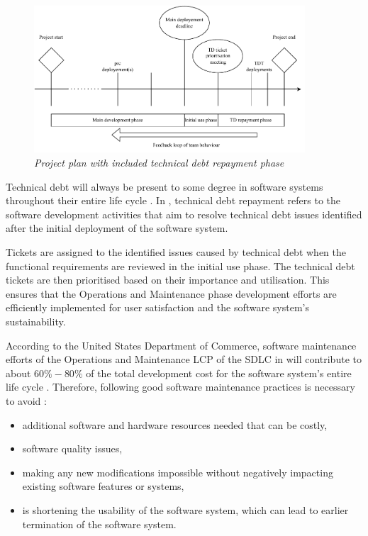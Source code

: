 \clearpage

\begin{figure}[!htb]
	\centering %
	\includegraphics[width=0.9\textwidth]{img/Chapter1/TD_repayment/TD_repayment.pdf}
	\caption[Project plan with included technical debt repayment phase]
	{\textit{Project plan with included technical debt repayment phase \cite{Wiese2021}}}\label{fig:ch1_tdRepayment}
\end{figure} 

Technical debt will always be present to some degree in software systems throughout their entire life cycle \cite{Wiese2021}. In , technical debt repayment refers to the software development activities that aim to resolve technical debt issues identified after the initial deployment of the software system.\par Tickets are assigned to the identified issues caused by technical debt when the functional requirements are reviewed in the initial use phase. The technical debt tickets are then prioritised based on their importance and utilisation. This ensures that the Operations and Maintenance phase development efforts are efficiently implemented for user satisfaction and the software system's sustainability.\par According to the United States Department of Commerce, software maintenance efforts of the Operations and Maintenance LCP of the SDLC in  will contribute to about $60\%-80\%$ of the total development cost for the software system's entire life cycle \cite{Ogheneovo2014, Ackermann2009, Tang2010}. Therefore, following good software maintenance practices is necessary to avoid \cite{DeLeon-Sigg2020}:

\begin{itemize}
	\item additional software and hardware resources needed that can be costly,
	\item software quality issues,
	\item making any new modifications impossible without negatively impacting existing software features or systems,
	\item is shortening the usability of the software system, which can lead to earlier termination of the software system.
\end{itemize}

